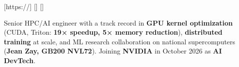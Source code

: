 \documentclass[9pt,a4paper,ragged2e,withhyper]{altacv}
\begin{document}

[https://]
[]
[]


\makecvheader


Senior HPC/AI engineer with a track record in \textbf{GPU kernel optimization} (CUDA, Triton: \textbf{19× speedup, 5× memory reduction}), \textbf{distributed training} at scale, and ML research collaboration on national supercomputers (\textbf{Jean Zay, GB200 NVL72}). Joining \textbf{NVIDIA} in October 2026 as \textbf{AI DevTech}.


\end{document}
